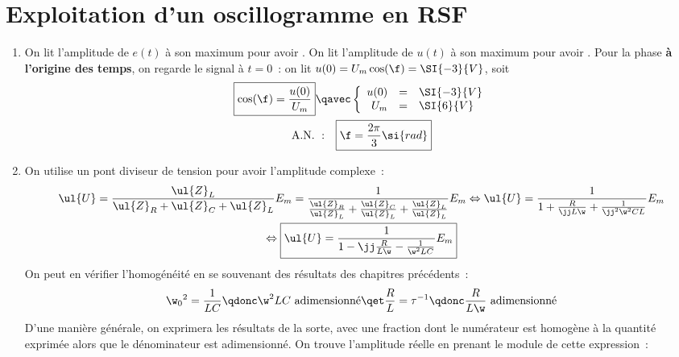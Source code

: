\documentclass[a4paper, 12pt, final, garamond]{book}
\begin{document}
\section{Exploitation d'un oscillogramme en RSF}
\begin{enumerate}
	\item On lit l'amplitude de $e(t)$ à son maximum pour avoir . On lit l'amplitude de $u(t)$ à son maximum pour avoir
	      . Pour la phase \textbf{à l'origine des temps},
	      on regarde le signal à $t = 0$~: on lit $u(0) = U_m\cos(\f) =
		      \SI{-3}{V}$, soit
	      \begin{gather*}
		      \boxed{\cos(\f) = \frac{u(0)}{U_m}}
		      \qavec
		      \left\{
		      \begin{array}{rcl}
			      u(0) & = & \SI{-3}{V} \\
			      U_m  & = & \SI{6}{V}
		      \end{array}
		      \right.\\
		      \mathrm{A.N.~:}\quad
		      \boxed{\f = \frac{2\pi}{3}\si{rad}}
	      \end{gather*}
	\item On utilise un pont diviseur de tension pour avoir l'amplitude
	      complexe~:
	      \begin{gather*}
		      \ul{U}
		      = \frac{\ul{Z}_L}{\ul{Z}_R + \ul{Z}_C + \ul{Z}_L}E_m
		      = \frac{1}{\frac{\ul{Z}_R}{\ul{Z}_L} + \frac{\ul{Z}_C}{\ul{Z}_L}
			      + \frac{\ul{Z}_L}{\ul{Z}_L}}E_m
		      \Leftrightarrow
		      \ul{U}
		      = \frac{1}{1 + \frac{R}{\jj L\w} + \frac{1}{\jj^2\w^2CL}}E_m\\
		      \Leftrightarrow
		      \boxed{
			      \ul{U}
			      = \frac{1}{1 -\jj \frac{R}{L\w} - \frac{1}{\w^2LC}}E_m
		      }
	      \end{gather*}
	      On peut en vérifier l'homogénéité en se souvenant des résultats des
	      chapitres précédents~:
	      \begin{gather*}
		      \w_0{}^2 = \frac{1}{LC}
		      \qdonc
		      \w^2LC \text{ adimensionné}
		      \qet
		      \frac{R}{L} = \tau^{-1}
		      \qdonc
		      \frac{R}{L\w} \text{ adimensionné}
	      \end{gather*}
	      D'une manière générale, on exprimera les résultats de la sorte, avec une
	      fraction dont le numérateur est homogène à la quantité exprimée alors
	      que le dénominateur est adimensionné. \bigbreak
	      On trouve l'amplitude réelle en prenant le module de cette expression~:

\end{enumerate}
\end{document}
